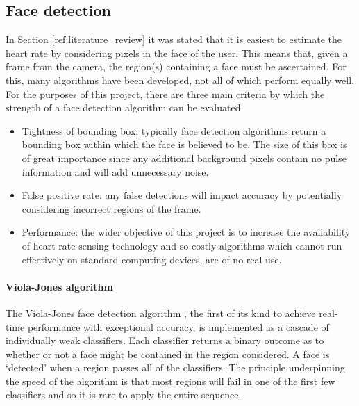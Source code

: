\subsection{Face detection}
In Section \ref{ref:literature_review} it was stated that it is 
easiest to estimate the heart rate by considering pixels in the face of the user. 
This means that, given a frame from the camera, the region(s) containing a face must be ascertained. For this, many algorithms have been developed, not all of which perform equally well.
For the purposes of this project, there are three main criteria by which the strength of a face detection algorithm can be evaluated.
\begin{itemize}
    \item Tightness of bounding box: typically face detection algorithms return a bounding box within which the face is believed to be. The size of this box is of great importance since any additional background pixels contain no pulse information and will add unnecessary noise.
    \item False positive rate: any false detections will impact accuracy by potentially considering incorrect regions of the frame.
    \item Performance: the wider objective of this project is to increase the availability of heart rate sensing technology and so costly algorithms which cannot run effectively on standard computing devices, are of no real use.
\end{itemize}


\paragraph{Viola-Jones algorithm} 
The Viola-Jones face detection algorithm \cite{Viola2004}, the first of its kind to achieve real-time performance with exceptional accuracy, is implemented as a cascade of 
individually weak classifiers. Each classifier returns a binary outcome as to whether or not a face might be contained in the region considered.
A face is `detected' when a region passes all of the classifiers. The principle underpinning the speed of the algorithm is that most regions will fail in one of the first few classifiers
and so it is rare to apply the entire sequence.

